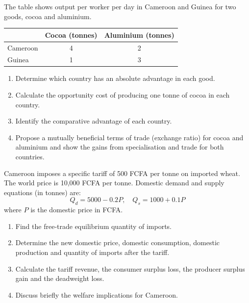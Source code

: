 \documentclass[11pt]{article}
\begin{document}
\begin{exercice}
The table shows output per worker per day in Cameroon and Guinea for two goods, cocoa and aluminium.

\begin{center}
\begin{tabular}{|l|c|c|}
\hline
 & Cocoa (tonnes) & Aluminium (tonnes) \\
\hline
Cameroon & 4 & 2 \\
Guinea & 1 & 3 \\
\hline
\end{tabular}
\end{center}

\begin{enumerate}
\item Determine which country has an absolute advantage in each good.
\item Calculate the opportunity cost of producing one tonne of cocoa in each country.
\item Identify the comparative advantage of each country.
\item Propose a mutually beneficial terms of trade (exchange ratio) for cocoa and aluminium and show the gains from specialisation and trade for both countries.
\end{enumerate}
\end{exercice}

\begin{exercice}
Cameroon imposes a specific tariff of 500 FCFA per tonne on imported wheat. The world price is 10,000 FCFA per tonne. Domestic demand and supply equations (in tonnes) are:
\[
Q_d = 5000 - 0.2P,\quad Q_s = 1000 + 0.1P
\]
where \(P\) is the domestic price in FCFA.
\begin{enumerate}
\item Find the free‑trade equilibrium quantity of imports.
\item Determine the new domestic price, domestic consumption, domestic production and quantity of imports after the tariff.
\item Calculate the tariff revenue, the consumer surplus loss, the producer surplus gain and the deadweight loss.
\item Discuss briefly the welfare implications for Cameroon.
\end{enumerate}
\end{exercice}
\end{document}
